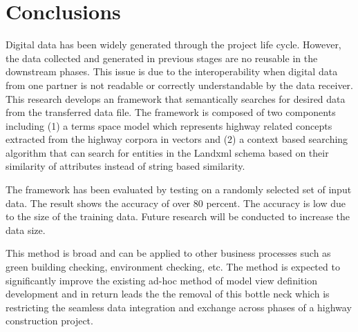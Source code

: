 \documentclass[Journal, InsideFigs, DoubleSpace]{ascelike} %
\begin{document}
\section{Conclusions} \label{sec:conclns} 
Digital data has been widely generated through the project life cycle. However, the data collected and generated in previous stages are no reusable in the downstream phases. This issue is due to the interoperability when digital data from one partner is not readable or correctly understandable by the data receiver. This research develops an framework that semantically searches for desired data from the transferred data file. The framework is composed of two components including (1) a terms space model which represents highway related concepts extracted from the highway corpora in vectors and (2) a context based searching algorithm that can search for entities in the Landxml schema based on their similarity of attributes instead of string based similarity. 
\par
The framework has been evaluated by testing on a randomly selected set of input data. The result shows the accuracy of over 80 percent. The accuracy is low due to the size of the training data. Future research will be conducted to increase the data size. 
\par
This method is broad and can be applied to other business processes such as green building checking, environment checking, etc. The method is expected to significantly improve the existing ad-hoc method of model view definition development and in return leads the the removal of this bottle neck which is restricting the seamless data integration and exchange across phases of a highway construction project. 


%
%
\end{document}
